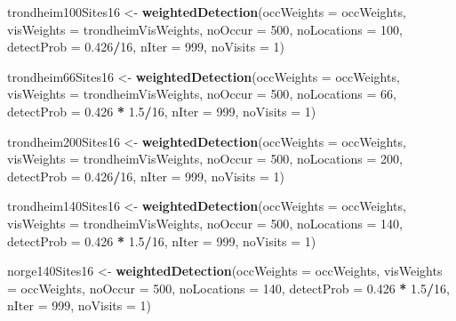\documentclass[]{article}
\newenvironment{Shaded}{\begin{snugshade}}{\end{snugshade}}
\newcommand{\KeywordTok}[1]{\textcolor[rgb]{0.13,0.29,0.53}{\textbf{#1}}}
\newcommand{\DataTypeTok}[1]{\textcolor[rgb]{0.13,0.29,0.53}{#1}}
\newcommand{\DecValTok}[1]{\textcolor[rgb]{0.00,0.00,0.81}{#1}}
\newcommand{\FloatTok}[1]{\textcolor[rgb]{0.00,0.00,0.81}{#1}}
\newcommand{\StringTok}[1]{\textcolor[rgb]{0.31,0.60,0.02}{#1}}
\newcommand{\OperatorTok}[1]{\textcolor[rgb]{0.81,0.36,0.00}{\textbf{#1}}}
\newcommand{\NormalTok}[1]{#1}
\begin{document}
\begin{Shaded}
\begin{Highlighting}[]
\NormalTok{trondheim100Sites16 <-}\StringTok{ }\KeywordTok{weightedDetection}\NormalTok{(}\DataTypeTok{occWeights =}\NormalTok{ occWeights, }\DataTypeTok{visWeights =}\NormalTok{ trondheimVisWeights, }
    \DataTypeTok{noOccur =} \DecValTok{500}\NormalTok{, }\DataTypeTok{noLocations =} \DecValTok{100}\NormalTok{, }\DataTypeTok{detectProb =} \FloatTok{0.426}\OperatorTok{/}\DecValTok{16}\NormalTok{, }\DataTypeTok{nIter =} \DecValTok{999}\NormalTok{, }\DataTypeTok{noVisits =} \DecValTok{1}\NormalTok{)}


\NormalTok{trondheim66Sites16 <-}\StringTok{ }\KeywordTok{weightedDetection}\NormalTok{(}\DataTypeTok{occWeights =}\NormalTok{ occWeights, }\DataTypeTok{visWeights =}\NormalTok{ trondheimVisWeights, }
    \DataTypeTok{noOccur =} \DecValTok{500}\NormalTok{, }\DataTypeTok{noLocations =} \DecValTok{66}\NormalTok{, }\DataTypeTok{detectProb =} \FloatTok{0.426} \OperatorTok{*}\StringTok{ }\FloatTok{1.5}\OperatorTok{/}\DecValTok{16}\NormalTok{, }\DataTypeTok{nIter =} \DecValTok{999}\NormalTok{, }
    \DataTypeTok{noVisits =} \DecValTok{1}\NormalTok{)}

\NormalTok{trondheim200Sites16 <-}\StringTok{ }\KeywordTok{weightedDetection}\NormalTok{(}\DataTypeTok{occWeights =}\NormalTok{ occWeights, }\DataTypeTok{visWeights =}\NormalTok{ trondheimVisWeights, }
    \DataTypeTok{noOccur =} \DecValTok{500}\NormalTok{, }\DataTypeTok{noLocations =} \DecValTok{200}\NormalTok{, }\DataTypeTok{detectProb =} \FloatTok{0.426}\OperatorTok{/}\DecValTok{16}\NormalTok{, }\DataTypeTok{nIter =} \DecValTok{999}\NormalTok{, }\DataTypeTok{noVisits =} \DecValTok{1}\NormalTok{)}

\NormalTok{trondheim140Sites16 <-}\StringTok{ }\KeywordTok{weightedDetection}\NormalTok{(}\DataTypeTok{occWeights =}\NormalTok{ occWeights, }\DataTypeTok{visWeights =}\NormalTok{ trondheimVisWeights, }
    \DataTypeTok{noOccur =} \DecValTok{500}\NormalTok{, }\DataTypeTok{noLocations =} \DecValTok{140}\NormalTok{, }\DataTypeTok{detectProb =} \FloatTok{0.426} \OperatorTok{*}\StringTok{ }\FloatTok{1.5}\OperatorTok{/}\DecValTok{16}\NormalTok{, }\DataTypeTok{nIter =} \DecValTok{999}\NormalTok{, }
    \DataTypeTok{noVisits =} \DecValTok{1}\NormalTok{)}

\NormalTok{norge140Sites16 <-}\StringTok{ }\KeywordTok{weightedDetection}\NormalTok{(}\DataTypeTok{occWeights =}\NormalTok{ occWeights, }\DataTypeTok{visWeights =}\NormalTok{ occWeights, }
    \DataTypeTok{noOccur =} \DecValTok{500}\NormalTok{, }\DataTypeTok{noLocations =} \DecValTok{140}\NormalTok{, }\DataTypeTok{detectProb =} \FloatTok{0.426} \OperatorTok{*}\StringTok{ }\FloatTok{1.5}\OperatorTok{/}\DecValTok{16}\NormalTok{, }\DataTypeTok{nIter =} \DecValTok{999}\NormalTok{, }
    \DataTypeTok{noVisits =} \DecValTok{1}\NormalTok{)}



\end{Highlighting}
\end{Shaded}
\end{document}
